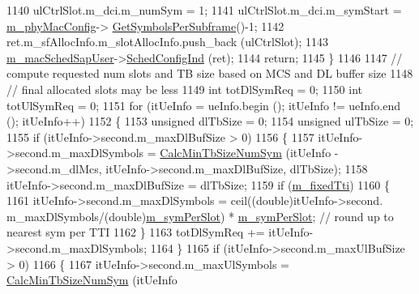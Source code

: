 \begin{DoxyCode}
1140                 ulCtrlSlot.m\_dci.m\_numSym = 1;
1141                 ulCtrlSlot.m\_dci.m\_symStart = \hyperlink{classns3_1_1MmWaveMacScheduler_a24d7af4971d2e500fe543cefbafa2fd9}{m\_phyMacConfig}->
      \hyperlink{classns3_1_1MmWavePhyMacCommon_a2fe835b76e3c689defa413e395cd10cb}{GetSymbolsPerSubframe}()-1;
1142                 ret.m\_sfAllocInfo.m\_slotAllocInfo.push\_back (ulCtrlSlot);
1143                 \hyperlink{classns3_1_1MmWaveFlexTtiMacScheduler_aea2c0392508e0b7f0a582d20c7068e84}{m\_macSchedSapUser}->\hyperlink{classns3_1_1MmWaveMacSchedSapUser_ac164dd52215c3924cf421b56089eece4}{SchedConfigInd} (ret);
1144                 \textcolor{keywordflow}{return};
1145         \}
1146 
1147         \textcolor{comment}{// compute requested num slots and TB size based on MCS and DL buffer size}
1148         \textcolor{comment}{// final allocated slots may be less}
1149         \textcolor{keywordtype}{int} totDlSymReq = 0;
1150         \textcolor{keywordtype}{int} totUlSymReq = 0;
1151         \textcolor{keywordflow}{for} (itUeInfo = ueInfo.begin (); itUeInfo != ueInfo.end (); itUeInfo++)
1152         \{
1153                 \textcolor{keywordtype}{unsigned} dlTbSize = 0;
1154                 \textcolor{keywordtype}{unsigned} ulTbSize = 0;
1155                 \textcolor{keywordflow}{if} (itUeInfo->second.m\_maxDlBufSize > 0)
1156                 \{
1157                         itUeInfo->second.m\_maxDlSymbols = \hyperlink{classns3_1_1MmWaveFlexTtiMacScheduler_addc3fd9accbea088f5614954fb0fde62}{CalcMinTbSizeNumSym} (itUeInfo
      ->second.m\_dlMcs, itUeInfo->second.m\_maxDlBufSize, dlTbSize);
1158                         itUeInfo->second.m\_maxDlBufSize = dlTbSize;
1159                         \textcolor{keywordflow}{if} (\hyperlink{classns3_1_1MmWaveFlexTtiMacScheduler_aac44befc273f7bdb0f0be0efc3d05f34}{m\_fixedTti})
1160                         \{
1161                                 itUeInfo->second.m\_maxDlSymbols = ceil((\textcolor{keywordtype}{double})itUeInfo->second.
      m\_maxDlSymbols/(\textcolor{keywordtype}{double})\hyperlink{classns3_1_1MmWaveFlexTtiMacScheduler_aa911d95e2956fcccca151a7353b8d42f}{m\_symPerSlot}) * \hyperlink{classns3_1_1MmWaveFlexTtiMacScheduler_aa911d95e2956fcccca151a7353b8d42f}{m\_symPerSlot}; \textcolor{comment}{// round up to nearest sym per TTI}
1162                         \}
1163                         totDlSymReq += itUeInfo->second.m\_maxDlSymbols;
1164                 \}
1165                 \textcolor{keywordflow}{if} (itUeInfo->second.m\_maxUlBufSize > 0)
1166                 \{
1167                         itUeInfo->second.m\_maxUlSymbols = \hyperlink{classns3_1_1MmWaveFlexTtiMacScheduler_addc3fd9accbea088f5614954fb0fde62}{CalcMinTbSizeNumSym} (itUeInfo

\end{DoxyCode}
